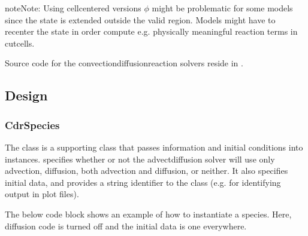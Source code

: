 \documentclass[letterpaper,10pt,english]{sphinxmanual}
\begin{document}
\begin{sphinxadmonition}{note}{Note:}
\sphinxAtStartPar
Using cell\sphinxhyphen{}centered versions \(\phi\) might be problematic for some models since the state is extended outside the valid region.
Models might have to recenter the state in order compute e.g. physically meaningful reaction terms in cut\sphinxhyphen{}cells.
\end{sphinxadmonition}

\sphinxAtStartPar
Source code for the convection\sphinxhyphen{}diffusion\sphinxhyphen{}reaction solvers reside in .


\subsection{Design}
\label{\detokenize{Solvers/CDR:design}}\label{\detokenize{Solvers/CDR:chap-cdrsolver}}

\subsubsection{CdrSpecies}
\label{\detokenize{Solvers/CDR:cdrspecies}}\label{\detokenize{Solvers/CDR:chap-cdrspecies}}
\sphinxAtStartPar
The  class is a supporting class that passes information and initial conditions into  instances.
 specifies whether or not the advect\sphinxhyphen{}diffusion solver will use only advection, diffusion, both advection and diffusion, or neither.
It also specifies initial data, and provides a string identifier to the class (e.g. for identifying output in plot files).

\sphinxAtStartPar
The below code block shows an example of how to instantiate a species.
Here, diffusion code is turned off and the initial data is one everywhere.

\begin{sphinxVerbatim}[commandchars=\\\{\},formatcom=\scriptsize]
    

           
        
             

     

            
       
\end{sphinxVerbatim}
\end{document}

